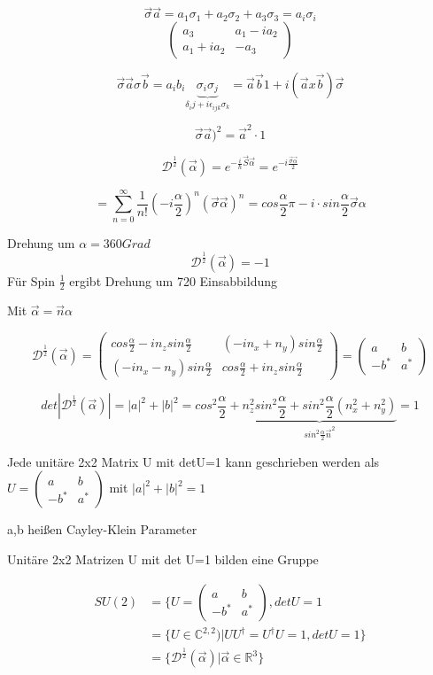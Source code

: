 \[\vec \sigma\vec a=a_1\sigma_1+a_2\sigma_2+a_3\sigma_3=a_i\sigma_i\]
\[\left(\begin{array}{cc} a_3&a_1-ia_2\\a_1+ia_2&-a_3\end{array}\right)\]

\[\vec\sigma\vec a\sigma\vec b=
a_ib_i\underbrace{\sigma_i\sigma_j}_{\delta_ij+i\epsilon_{ijk}\sigma_k}=\vec
a\vec b\mathcal 1+i(\vec a x \vec b)\vec \sigma\]

\[\vec \sigma\vec a)^2=\vec a^2\cdot 1\]

\[\mathcal D^{\frac 1 2}(\vec \alpha)=e^{-\frac i \hbar \vec S\vec\alpha}=e^{-i \frac{ \vec
    \sigma\vec\alpha} 2}\]

\[=\sum^\infty_{n=0}\frac 1 {n!} (-i\frac \alpha 2)^n(\vec \sigma\vec
\alpha)^n=cos\frac \alpha 2\pi - i\cdot sin\frac \alpha 2 \vec \sigma\alpha\]

Drehung um \(\alpha=360Grad\)
\[\mathcal D^{\frac 1 2}(\vec \alpha)=-1\]
Für Spin \(\frac 1 2\) ergibt Drehung um 720 Einsabbildung

Mit \(\vec \alpha =\vec n \alpha\)

\[\mathcal D^{\frac 1 2}(\vec \alpha)=\left(\begin{array}{cc}
cos\frac \alpha 2 -in_zsin\frac\alpha 2&(-in_x+n_y)sin\frac \alpha 2\\
(-in_x-n_y)sin\frac \alpha 2&cos\frac \alpha 2 +in_zsin\frac\alpha 2
\end{array}\right)=\left(\begin{array}{cc}
a&b\\
-b^*&a^*
\end{array}\right)
\]


\[det|\mathcal D^{\frac 1 2}(\vec \alpha)|=|a|^2+|b|^2=cos^2\frac \alpha
2+\underbrace{n_z^2sin^2\frac \alpha 2+sin^2\frac \alpha
  2(n_x^2+n_y^2)}_{sin^2\frac \alpha 2\vec n^2}=1\]

Jede unitäre 2x2 Matrix U mit detU=1 kann geschrieben werden als \(U=\left(\begin{array}{cc}
a&b\\
-b^*&a^*
\end{array}\right)\) mit \(|a|^2+|b|^2=1\)

a,b heißen Cayley-Klein Parameter

Unitäre 2x2 Matrizen U mit det U=1 bilden eine Gruppe

\begin{align}
SU(2)&=\{U=\left(\begin{array}{cc}
a&b\\
-b^*&a^*
\end{array}\right), det U = 1 \\
&=\{U\in\mathbb C^{2,2})|UU^\dagger=U^\dagger U=1,detU=1\}\\
&=\{\mathcal D^{\frac 1 2}(\vec \alpha)|\vec \alpha\in \mathbb R^3\}
\end{align}


